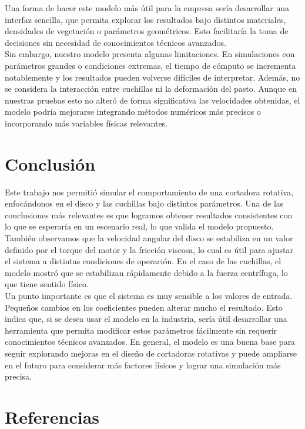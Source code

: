 \documentclass[12pt]{article}
\begin{document}
Una forma de hacer este modelo más útil para la empresa sería desarrollar una interfaz sencilla, que permita explorar los resultados bajo distintos materiales, densidades de vegetación o parámetros geométricos. Esto facilitaría la toma de decisiones sin necesidad de conocimientos técnicos avanzados.\\

Sin embargo, nuestro modelo presenta algunas limitaciones. En simulaciones con parámetros grandes o condiciones extremas, el tiempo de cómputo se incrementa notablemente y los resultados pueden volverse difíciles de interpretar. Además, no se considera la interacción entre cuchillas ni la deformación del pasto. Aunque en nuestras pruebas esto no alteró de forma significativa las velocidades obtenidas, el modelo podría mejorarse integrando métodos numéricos más precisos o incorporando más variables físicas relevantes.


\section{Conclusión}
Este trabajo nos permitió simular el comportamiento de una cortadora rotativa, enfocándonos en el disco y las cuchillas bajo distintos parámetros. Una de las conclusiones más relevantes es que logramos obtener resultados consistentes con lo que se esperaría en un escenario real, lo que valida el modelo propuesto. También observamos que la velocidad angular del disco se estabiliza en un valor definido por el torque del motor y la fricción viscosa, lo cual es útil para ajustar el sistema a distintas condiciones de operación. En el caso de las cuchillas, el modelo mostró que se estabilizan rápidamente debido a la fuerza centrífuga, lo que tiene sentido físico.\\

Un punto importante es que el sistema es muy sensible a los valores de entrada. Pequeños cambios en los coeficientes pueden alterar mucho el resultado. Esto indica que, si se desea usar el modelo en la industria, sería útil desarrollar una herramienta que permita modificar estos parámetros fácilmente sin requerir conocimientos técnicos avanzados.
En general, el modelo es una buena base para seguir explorando mejoras en el diseño de cortadoras rotativas y puede ampliarse en el futuro para considerar más factores físicos y lograr una simulación más precisa.

\section{Referencias}
\end{document}
